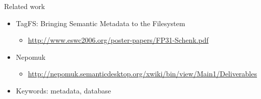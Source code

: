 

\begin{frame}{Related work}
    \begin{itemize}
        \item TagFS: Bringing Semantic Metadata to the Filesystem
            \begin{itemize}
                \item \url{http://www.eswc2006.org/poster-papers/FP31-Schenk.pdf}
            \end{itemize}

        \item Nepomuk
            \begin{itemize}
                \item \url{http://nepomuk.semanticdesktop.org/xwiki/bin/view/Main1/Deliverables}
            \end{itemize}

        \item Keywords: metadata, database
    \end{itemize}

\end{frame}


